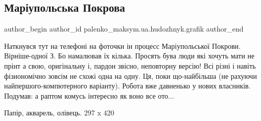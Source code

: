  
 
 
 
 

\subsection{Маріупольська Покрова}
\label{sec:20_01_2023.fb.palenko_maksym.ua.hudozhnyk.grafik.1.mar_upolska_pokrova}

\ifcmt
 author_begin
   author_id palenko_maksym.ua.hudozhnyk.grafik
 author_end
\fi

Наткнувся тут на телефоні на фоточки ін процесс Маріупольської Покрови.
Вірніше-одної З. Бо намалював їх кілька. Просять бува люди які хочуть мати не
прінт а свою, оригінальну і, пардон звісно, неповторну версію! Всі різні і
навіть фізиономічно зовсім не схожі одна на одну. Ця, поки що-найбільша (не
рахуючи найпершого-компютерного варіанту). Робота вже давненько у нових
власників. Подумав: а раптом комусь інтересно як воно все ото...

Папір, акварель, олівець. 297 x 420

